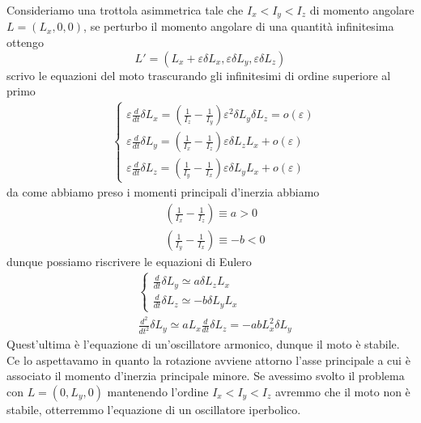 \documentclass[
10pt, %
a4paper, %
oneside, %
headinclude,footinclude, %
BCOR5mm, %
]{scrartcl}
\begin{document}
\begin{esempio}
	Consideriamo una trottola asimmetrica tale che \(I_x<I_y<I_z\) di momento angolare \(L = (L_x, 0, 0)\), se perturbo il momento angolare di una quantità infinitesima ottengo
	\[L' = (L_x+\varepsilon\delta L_x, \varepsilon\delta L_y, \varepsilon\delta L_z)\]
	scrivo le equazioni del moto trascurando gli infinitesimi di ordine superiore al primo
\begin{align*}
	&\begin{cases}
		\varepsilon\frac{d}{dt}\delta L_x =\left(\frac{1}{I_z}-\frac{1}{I_y}\right)\varepsilon^2\delta L_y\delta L_z=o(\varepsilon)\\
		\varepsilon\frac{d}{dt}\delta L_y =\left(\frac{1}{I_x}-\frac{1}{I_z}\right)\varepsilon\delta L_zL_x+o(\varepsilon)\\
		\varepsilon\frac{d}{dt}\delta L_z =\left(\frac{1}{I_y}-\frac{1}{I_x}\right)\varepsilon\delta L_yL_x+o(\varepsilon)
	\end{cases}
\end{align*}
da come abbiamo preso i momenti principali d'inerzia abbiamo
\begin{align*}
	&\left(\frac{1}{I_x}-\frac{1}{I_z}\right)\equiv a >0\\
	&\left(\frac{1}{I_y}-\frac{1}{I_x}\right)\equiv -b < 0
\end{align*}
dunque possiamo riscrivere le equazioni di Eulero 
\begin{align*}
	&\begin{cases}
		\frac{d}{dt}\delta L_y \simeq a\delta L_zL_x\\
		\frac{d}{dt}\delta L_z \simeq-b\delta L_yL_x
	\end{cases}\\
 	&\frac{d^2}{dt^2}\delta L_y \simeq aL_x\frac{d}{dt}\delta L_z = -abL_x^2\delta L_y
	\end{align*}
Quest'ultima è l'equazione di un'oscillatore armonico, dunque il moto è stabile. Ce lo aspettavamo in quanto la rotazione avviene attorno l'asse principale a cui è associato il momento d'inerzia principale minore. Se avessimo svolto il problema con \(L = (0, L_y, 0)\) mantenendo l'ordine \(I_x<I_y<I_z\) avremmo che il moto non è stabile, otterremmo l'equazione di un oscillatore iperbolico.
\end{esempio}
\end{document}
